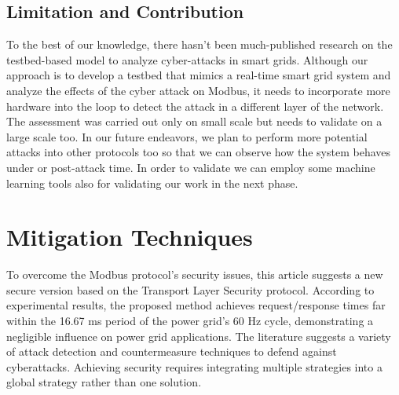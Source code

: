 \documentclass[letterpaper,10pt,conference]{IEEEtran}
\begin{document}
\subsection{Limitation and Contribution}
To the best of our knowledge, there hasn’t been much-published research on the testbed-based model to analyze cyber-attacks in smart grids. Although our approach is to develop a testbed that mimics a real-time smart grid system and analyze the effects of the cyber attack on Modbus, it needs to incorporate more hardware into the loop to detect the attack in a different layer of the network. The assessment was carried out only on small scale but needs to validate on a large scale too. In our future endeavors, we plan to perform more potential attacks into other protocols too so that we can observe how the system behaves under or post-attack time. In order to validate we can employ some machine learning tools also for validating our work in the next phase.

\section{Mitigation Techniques}
 To overcome the Modbus protocol's security issues, this article suggests a new secure version based on the Transport Layer Security protocol. According to experimental results, the proposed method achieves request/response times far within the 16.67 ms period of the power grid's 60 Hz cycle, demonstrating a negligible influence on power grid applications. The literature suggests a variety of attack detection and countermeasure techniques to defend against cyberattacks\cite{R19}. Achieving security requires integrating multiple strategies into a global strategy rather than one solution.
\end{document}
